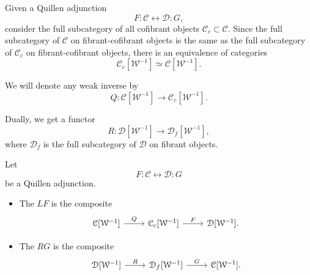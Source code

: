 \documentclass[main.tex]{subfiles}
\begin{document}
Given a Quillen adjunction
\begin{equation*}
  F : \mathcal{C} \leftrightarrow \mathcal{D} : G,
\end{equation*}
consider the full subcategory of all cofibrant objects $\mathcal{C}_{c} \subset \mathcal{C}$. Since the full subcategory of $\mathcal{C}$ on fibrant-cofibrant objects is the same as the full subcategory of $\mathcal{C}_{c}$ on fibrant-cofibrant objects, there is an equivalence of categories
\begin{equation*}
  \mathcal{C}_{c}[\mathcal{W}^{-1}] \simeq \mathcal{C}[\mathcal{W}^{-1}].
\end{equation*}

We will denote any weak inverse by
\begin{equation*}
  Q\colon \mathcal{C}[\mathcal{W}^{-1}] \to \mathcal{C}_{c}[\mathcal{W}^{-1}].
\end{equation*}

Dually, we get a functor
\begin{equation*}
  R\colon \mathcal{D}[\mathcal{W}^{-1}] \to \mathcal{D}_{f}[\mathcal{W}^{-1}],
\end{equation*}
where $\mathcal{D}_{f}$ is the full subcategory of $\mathcal{D}$ on fibrant objects.

\begin{definition}
  \label{def:left_derived_functor}
  Let
  \begin{equation*}
    F : \mathcal{C} \leftrightarrow \mathcal{D} : G
  \end{equation*}
  be a Quillen adjunction.
  \begin{itemize}
    \item The  $LF$ is the composite
      \begin{equation*}
        \begin{tikzcd}
          \mathcal{C}[\mathcal{W}^{-1}]
          \arrow[r, "Q"]
          & \mathcal{C}_{c}[\mathcal{W}^{-1}]
          \arrow[r, "F"]
          & \mathcal{D}[\mathcal{W}^{-1}].
        \end{tikzcd}
      \end{equation*}

    \item The  $RG$ is the composite
      \begin{equation*}
        \begin{tikzcd}
          \mathcal{D}[\mathcal{W}^{-1}]
          \arrow[r, "R"]
          & \mathcal{D}_{f}[\mathcal{W}^{-1}]
          \arrow[r, "G"]
          & \mathcal{C}[\mathcal{W}^{-1}].
        \end{tikzcd}
      \end{equation*}
  \end{itemize} 
\end{definition}
\end{document}
